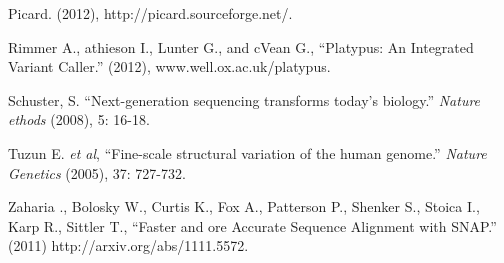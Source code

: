 \documentclass[10pt]{article}
\begin{document}
\begin{thebibliography}{1}
 Picard. (2012), http://picard.sourceforge.net/.

 Rimmer A., athieson I., Lunter G., and cVean G., ``Platypus: An Integrated Variant Caller.'' (2012), www.well.ox.ac.uk/platypus.

 Schuster, S. ``Next-generation sequencing transforms today's biology.'' {\em Nature ethods} (2008), 5: 16-18.

 Tuzun E. {\em et al}, ``Fine-scale structural variation of the human genome.'' {\em Nature Genetics} (2005), 37: 727-732. 

 Zaharia ., Bolosky W., Curtis K., Fox A., Patterson P., Shenker S., Stoica I., Karp R., Sittler T., ``Faster and ore Accurate Sequence Alignment with SNAP.'' (2011) http://arxiv.org/abs/1111.5572.

\end{thebibliography}
\end{document}
